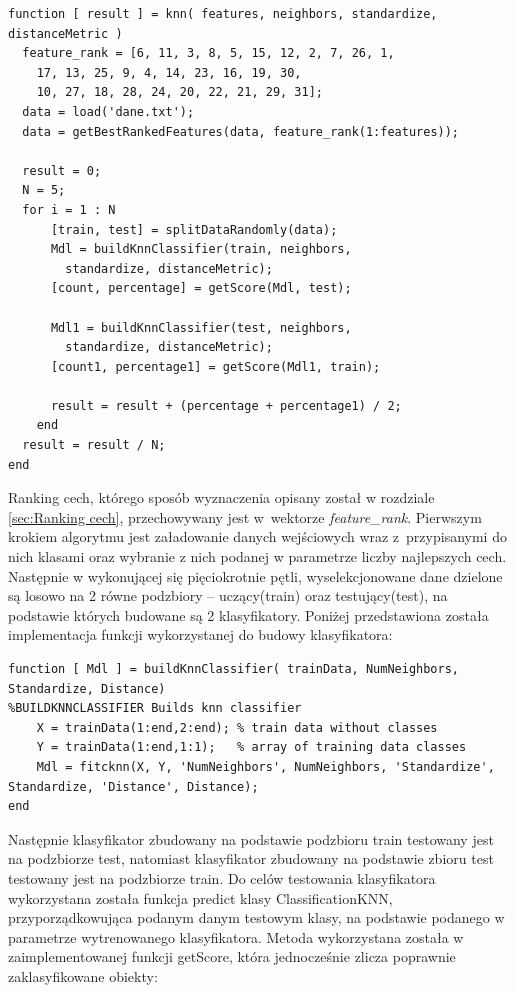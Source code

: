 \documentclass[11pt, a4paper, titlepage]{report}
\begin{document}
\begin{lstlisting}[label={lst:knn},caption={Algorytm walidacji krzyżowej dla algorytmu kNN.}]
function [ result ] = knn( features, neighbors, standardize, distanceMetric )
  feature_rank = [6, 11, 3, 8, 5, 15, 12, 2, 7, 26, 1,
    17, 13, 25, 9, 4, 14, 23, 16, 19, 30,
    10, 27, 18, 28, 24, 20, 22, 21, 29, 31];
  data = load('dane.txt');
  data = getBestRankedFeatures(data, feature_rank(1:features));

  result = 0;
  N = 5;
  for i = 1 : N
      [train, test] = splitDataRandomly(data);
      Mdl = buildKnnClassifier(train, neighbors,
        standardize, distanceMetric);
      [count, percentage] = getScore(Mdl, test);

      Mdl1 = buildKnnClassifier(test, neighbors,
        standardize, distanceMetric);
      [count1, percentage1] = getScore(Mdl1, train);

      result = result + (percentage + percentage1) / 2;
    end
  result = result / N;
end
\end{lstlisting}

Ranking cech, którego sposób wyznaczenia opisany został w rozdziale \ref{sec:Ranking cech}, przechowywany jest w wektorze \textit{feature\_rank}. Pierwszym krokiem algorytmu jest załadowanie danych wejściowych wraz z przypisanymi do nich klasami oraz wybranie z nich podanej w parametrze liczby najlepszych cech.
Następnie w wykonującej się pięciokrotnie pętli, wyselekcjonowane dane dzielone są losowo na 2 równe podzbiory – uczący(train) oraz testujący(test), na podstawie których budowane są 2 klasyfikatory. Poniżej przedstawiona została implementacja funkcji wykorzystanej do budowy klasyfikatora:\\

\begin{lstlisting}[label={lst:knn_klasyfikator},caption={Budowa klasyfikatora kNN.}]
function [ Mdl ] = buildKnnClassifier( trainData, NumNeighbors, Standardize, Distance)
%BUILDKNNCLASSIFIER Builds knn classifier
    X = trainData(1:end,2:end); % train data without classes
    Y = trainData(1:end,1:1);   % array of training data classes
    Mdl = fitcknn(X, Y, 'NumNeighbors', NumNeighbors, 'Standardize', Standardize, 'Distance', Distance);
end
\end{lstlisting}

Następnie klasyfikator zbudowany na podstawie podzbioru train testowany jest na podzbiorze test, natomiast klasyfikator zbudowany na podstawie zbioru test testowany jest na podzbiorze train. Do celów testowania klasyfikatora wykorzystana została funkcja predict klasy ClassificationKNN, przyporządkowująca podanym danym testowym klasy, na podstawie podanego w parametrze wytrenowanego klasyfikatora. Metoda wykorzystana została w zaimplementowanej funkcji getScore, która jednocześnie zlicza poprawnie zaklasyfikowane obiekty:\\
\end{document}
